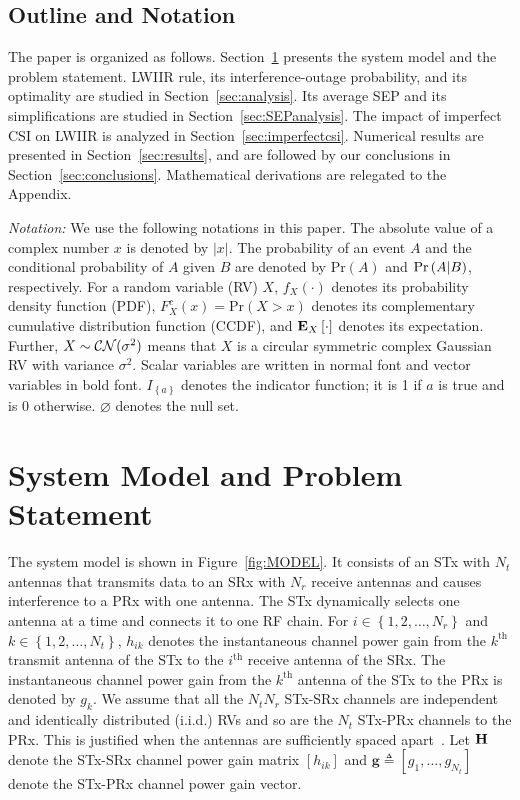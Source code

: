 \documentclass[12pt,draftcls,peerreview,onecolumn]{IEEEtran}
\newcommand{\brac}[1]{\left({#1}\right)}
\newcommand{\cbrac}[1]{\left\{{#1}\right\}}
\newcommand{\indic}[1]{I_{\cbrac{#1}}}
\newcommand{\define}{\triangleq}
\newcommand{\mtx}[1]{{\bf #1}} %
\newcommand{\explow}[2]{{\bf{E}}_{#1}\left[{#2}\right]}
\newcommand{\prob}[1]{\text{Pr}\brac{#1}}
\newcommand{\given}{\arrowvert}
\newcommand{\Nt}{{N_t}}
\newcommand{\Nr}{{N_r}}
\newcommand{\such}{h}
\newcommand{\puch}{g}
\newcommand{\hk}[1]{{\such_{#1}}}
\newcommand{\gk}[1]{{\puch_{#1}}}
\newcommand{\g}{\mathbf{\puch}}
\newcommand{\antopts}{\left\{1,2,\ldots,\Nt\right\}}
\newcommand{\nropts}{\left\{1,2,\ldots,\Nr\right\}}
\newcommand{\Hmx}{\mtx{H}}
\newcommand{\ith}{i^{\text{th}}}
\newcommand{\kth}{k^{\text{th}}}
\newcommand{\nullset}{\varnothing}
\begin{document}
\subsection{Outline and Notation}
The  paper is organized as follows. Section~\ref{sec:model} presents the system model and the problem statement. LWIIR rule, its interference-outage probability, and its optimality are studied in Section~\ref{sec:analysis}. Its average SEP and its simplifications are studied in Section~\ref{sec:SEPanalysis}. The impact of imperfect CSI on LWIIR  is analyzed in Section~\ref{sec:imperfectcsi}. Numerical results are presented in Section~\ref{sec:results}, and are followed by our conclusions in Section~\ref{sec:conclusions}. Mathematical derivations are relegated to the Appendix.

\emph{Notation:} We use the following notations in this paper. The absolute value of a complex number $x$ is denoted by $|x|$. The probability of an event $A$ and the conditional probability of $A$ given $B$ are denoted by $\prob{A}$ and $\prob{A \given B}$, respectively. For a random variable (RV) $X$, $f_{X}(\cdot)$ denotes its probability density function (PDF), $F_{X}^{c}(x)=\prob{X>x}$ denotes its complementary cumulative distribution function (CCDF), and $\explow{X}{\cdot}$ denotes its expectation. Further, $X \sim {\cal CN}(\sigma^2)$ means that $X$ is a circular symmetric complex Gaussian RV with  variance $\sigma^2$.  Scalar variables are written in normal font and vector variables in bold font. $\indic{a}$ denotes the indicator function; it is 1 if $a$ is true and is 0 otherwise. $\nullset$ denotes the null set.

\section{System Model and Problem Statement}
\label{sec:model}
The system model is shown in Figure~\ref{fig:MODEL}. It consists of an STx with $\Nt$ antennas that transmits data to an SRx with $\Nr$ receive antennas and causes interference to a PRx with one antenna. The STx dynamically selects one antenna at a time and connects it to one RF chain. For $i \in \nropts$ and $k \in \antopts$, $\hk{ik}$ denotes the instantaneous channel power gain from the $\kth$ transmit antenna of the STx to the $\ith$ receive antenna of the SRx. The instantaneous channel power gain from the $\kth$ antenna of the STx to the PRx is denoted by $\gk{k}$. We assume that all the $\Nt\Nr$ STx-SRx channels are independent and identically distributed (i.i.d.) RVs and so are the $\Nt$ STx-PRx channels to the PRx. This is justified when the antennas are sufficiently spaced apart~\cite{Fakhan_2014_TSP,Kong_2011_JCN,Sarvendranath_2013_TCOM,Hanif_2015_globecom}. Let $\Hmx$ denote the STx-SRx channel power gain matrix $\left[\hk{ik}\right]$ and $\g\define\left[\gk{1},\ldots,\gk{\Nt}\right]$ denote the STx-PRx channel power gain vector.
\end{document}
